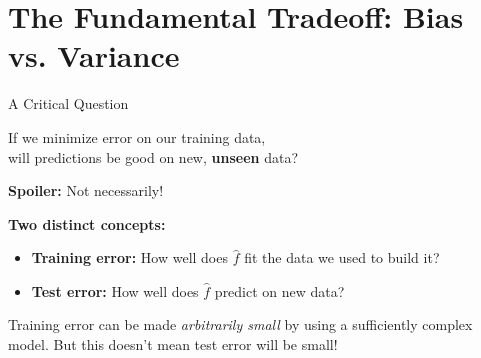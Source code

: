 \documentclass[10pt]{beamer}
\newcommand{\highlight}[1]{\textcolor{AccentOrange}{\textbf{#1}}}
\begin{document}
\section{The Fundamental Tradeoff: Bias vs. Variance}

\begin{frame}{A Critical Question}
  \begin{center}
    \Large
    If we minimize error on our training data,\\
    will predictions be good on new, \highlight{unseen} data?
  \end{center}
  
  \vspace{1em}
  \textbf{Spoiler:} Not necessarily!
  
  \vspace{1em}
  \textbf{Two distinct concepts:}
  \begin{itemize}
    \item \textbf{Training error:} How well does $\widehat{f}$ fit the data we used to build it?
    \item \textbf{Test error:} How well does $\widehat{f}$ predict on new data?
  \end{itemize}
  
  \vspace{0.5em}
  Training error can be made \emph{arbitrarily small} by using a sufficiently complex model. But this doesn't mean test error will be small!
\end{frame}
\end{document}
